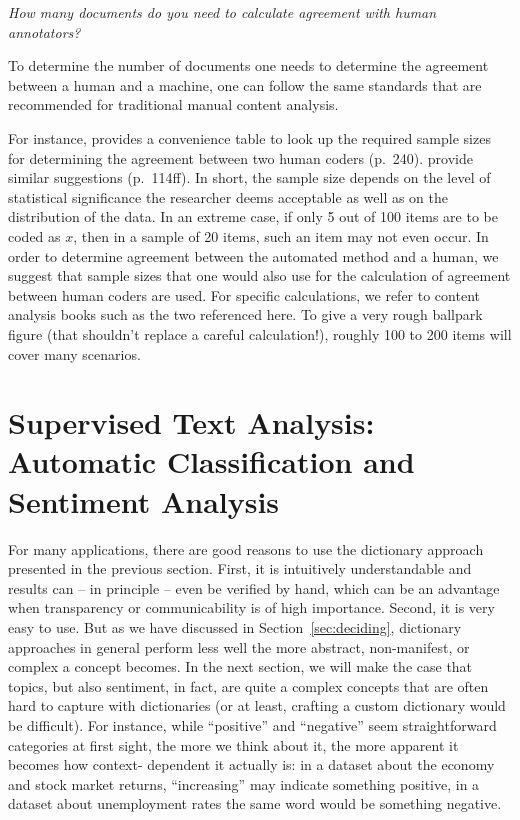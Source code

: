 \begin{feature}
\emph{How many documents do you need to calculate agreement with human annotators?}

  To determine the number of documents one needs to determine the agreement between a human and a machine, one can follow the same standards that are recommended for traditional manual content analysis.

  For instance, \citet{Krippendorff2004} provides a convenience table to look up the required sample sizes for determining the agreement between two human coders (p.~240). \citet{riffe2019} provide similar suggestions (p.~114ff). In short, the sample size depends on the level of statistical significance the researcher deems acceptable as well as on the distribution of the data. In an extreme case, if only 5 out of 100 items are to be coded as $x$, then in a sample of 20 items, such an item may not even occur. In order to determine agreement between the automated method and a human, we suggest that sample sizes that one would also use for the calculation of agreement between human coders are used. For specific calculations, we refer to content analysis books such as the two referenced here. To give a very rough ballpark figure (that shouldn't replace a careful calculation!), roughly 100 to 200 items will cover many scenarios.
  \end{feature}

%
\section{Supervised Text Analysis: Automatic Classification and Sentiment Analysis}
\label{sec:supervised}

For many applications, there are good reasons to use the dictionary
approach presented in the previous section. First, it is intuitively
understandable and results can -- in principle --
even be verified by hand, which can be an advantage when transparency
or communicability is of high importance. Second, it is very easy to
use. But as we have discussed in Section~\ref{sec:deciding}, dictionary approaches
in general perform less well the more abstract, non-manifest, or
complex a concept becomes. In the next section, we will make the case
that topics, but also sentiment, in fact, are quite a complex concepts
that are often hard to capture with dictionaries (or at least, crafting
a custom dictionary would be  difficult). For instance, while ``positive''
and ``negative'' seem straightforward categories at first sight,
the more we think about it, the more apparent it becomes how context-
dependent it actually is: in a dataset about the economy and stock
market returns, ``increasing'' may indicate something positive,
in a dataset about unemployment rates the same word would be something
negative.

